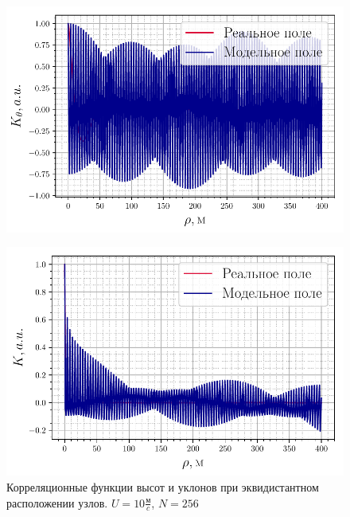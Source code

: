 \begin{figure}[h!]
	\begin{minipage}{0.49\linewidth}
			\centering
			\includegraphics[width=\linewidth]{fig/correlation_height_slopes0.pdf}
			\label{fig:ch0}		
	\end{minipage}
	\hfill
	\begin{minipage}{0.49\linewidth}
			\centering
			\includegraphics[width=\linewidth]{fig/correlation_angles_slopes0.pdf}
	\end{minipage}
	\caption{Корреляционные функции высот и уклонов при эквидистантном расположении узлов. $U=10 \frac{\text{м}}{c}$, $N=256$}
			\label{fig:ca0}		
\end{figure}

